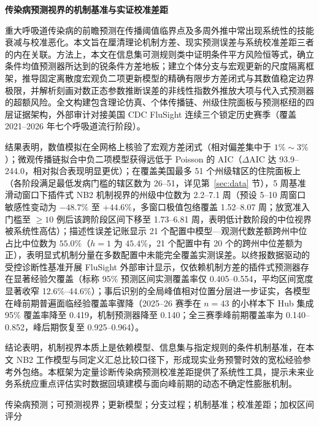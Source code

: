 \documentclass[11pt,a4paper]{article}
\theoremstyle{plain}
\theoremstyle{definition}
\begin{document}
\thispagestyle{plain}
\setcounter{section}{-1}

\begin{center}
    \vspace*{-0.6em}
    {\heiti\bfseries 传染病预测视界的机制基准与实证校准差距} \\[0.4em]
\end{center}

{\small
{}重大呼吸道传染病的前瞻预测在传播阈值临界点及多周外推中常出现系统性的技能衰减与校准恶化。本文旨在厘清理论机制方差、现实预测误差与系统校准差距三者的内在关联。方法上，本文在信息集可测规则类中证明条件平方风险恒等式，确立条件均值预测器所达到的锐条件方差地板；建立个体分支与宏观更新的尺度隔离框架，推导固定离散度宏观负二项更新模型的精确有限步方差闭式与其数值稳定边界极限，并解析刻画对数正态参数推断误差的非线性指数外推放大项与代入式预测器的超额风险。全文构建包含理论仿真、个体传播链、州级住院面板与预测枢纽的四层证据架构，外部审计对接美国 CDC FluSight 连续三个锁定历史赛季（覆盖 2021--2026 年七个呼吸道流行阶段）。

结果表明，数值模拟在全网格上核验了宏观方差闭式（相对偏差集中于 $1\%\sim 3\%$）；微观传播链拟合中负二项模型获得远低于 Poisson 的 AIC（$\Delta\text{AIC}$ 达 93.9--244.0，相对拟合表现明显更优）；在覆盖美国最多 51 个州级辖区的住院面板上（各阶段满足最低发病门槛的辖区数为 26--51，详见第~\ref{sec:data} 节），5 周基准滑动窗口下插件式 NB2 机制视界的州级中位数为 2.2--7.1 周（预设 5--10 周窗口敏感性变动为 $-48.7\%$ 至 $+44.6\%$，多窗口极值包络覆盖 1.52--8.07 周；放宽准入门槛至 $\ge 10$ 例后该跨阶段区间下移至 1.73--6.81 周，表明低计数阶段的中位视界被系统性高估）；描述性误差记账显示 21 个配置中模型—观测代数差额跨州中位占比中位数为 $55.0\%$（$h=1$ 为 $45.4\%$，21 个配置中有 20 个的跨州中位差额为正），表明显式机制分量在多数配置中未能完全覆盖实测误差。以终报数据驱动的受控诊断性基准开展 FluSight 外部审计显示，仅依赖机制方差的插件式预测器存在显著经验欠覆盖（标称 95\% 预测区间实测覆盖率仅 0.405--0.554，平均区间宽度显著收窄 12.6\%--44.6\%）；事后识别的全局峰值相对位置分层进一步证实，各模型在峰前期普遍面临经验覆盖率骤降（2025--26 赛季在 $n=43$ 的小样本下 Hub 集成 95\% 覆盖率降至 0.419，机制预测器降至 0.140；全三赛季峰前期覆盖率为 0.140--0.852，峰后期恢复至 0.925--0.964）。

结论表明，机制视界本质上是依赖模型、信息集与指定规则的条件机制基准，在本文 NB2 工作模型与同定义汇总比较口径下，形成现实业务预警时效的宽松经验参考外包络。本框架为定量诊断传染病预测校准差距提供了系统性工具，提示未来业务系统应重点评估实时数据回填建模与面向峰前期的动态不确定性膨胀机制。

\vspace{0.2em}
传染病预测；可预测视界；更新模型；分支过程；机制基准；校准差距；加权区间评分
}
\end{document}

